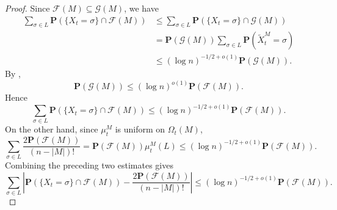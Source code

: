 \begin{proof}
    Since $\mathcal F(M)\subseteq \mathcal G(M)$, we have
    \begin{align*}
        \sum_{\sigma\in L}
        \mathbf P(\{X_t=\sigma\}\cap \mathcal F(M))
        &\leq
        \sum_{\sigma\in L}
        \mathbf P(\{X_t=\sigma\}\cap \mathcal G(M)) \\
        &=
        \mathbf P(\mathcal G(M))
        \sum_{\sigma\in L}
        \mathbf P(\widetilde X_t^M=\sigma) \\
        &\leq
        (\log n)^{-1/2+o(1)}\mathbf P(\mathcal G(M)).
    \end{align*}
    By ,
    $$
        \mathbf P(\mathcal G(M))
        \leq
        (\log n)^{o(1)}\mathbf P(\mathcal F(M)).
    $$
    Hence
    $$
        \sum_{\sigma\in L}
        \mathbf P(\{X_t=\sigma\}\cap \mathcal F(M))
        \leq
        (\log n)^{-1/2+o(1)}\mathbf P(\mathcal F(M)).
    $$
    On the other hand, since $\mu_t^M$ is uniform on $\Omega_t(M)$,
    $$
        \sum_{\sigma\in L}
        \frac{2\mathbf P(\mathcal F(M))}{(n-|M|)!}
        =
        \mathbf P(\mathcal F(M))\mu_t^M(L)
        \leq
        (\log n)^{-1/2+o(1)}\mathbf P(\mathcal F(M)).
    $$
    Combining the preceding two estimates gives
    $$
        \sum_{\sigma\in L}
        \left|
        \mathbf P(\{X_t=\sigma\}\cap \mathcal F(M))
        -
        \frac{2\mathbf P(\mathcal F(M))}{(n-|M|)!}
        \right|
        \leq
        (\log n)^{-1/2+o(1)}\mathbf P(\mathcal F(M)).
    $$


\end{proof}
